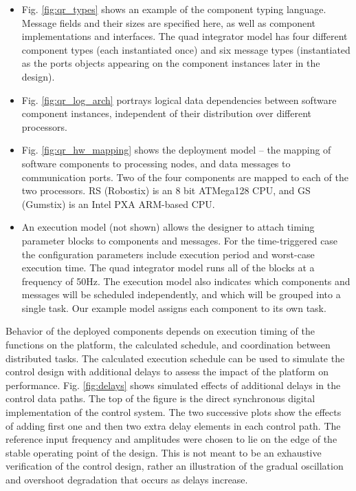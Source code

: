 \begin{itemize}
 \item Fig. \ref{fig:qr_types} shows an example of the component typing
language.  Message fields and their sizes are specified here, as well as
component implementations and interfaces.  The quad integrator model has four
different component types (each instantiated once) and six message types
(instantiated as the ports objects appearing on the component instances later
in the design).
 \item Fig. \ref{fig:qr_log_arch} portrays logical data dependencies between
software component instances, independent of their distribution over different
processors.
 \item Fig. \ref{fig:qr_hw_mapping} shows the deployment model -- the mapping
of software components to processing nodes, and data messages to communication
ports.  Two of the four components are mapped to each of the two processors.  RS
(Robostix) is an 8 bit ATMega128 CPU, and GS (Gumstix) is an Intel PXA ARM-based CPU.
 \item An execution model (not shown) allows the designer to attach timing parameter
blocks to components and messages.  For the time-triggered case the configuration 
parameters include execution period and worst-case execution time.  The quad integrator
model runs all of the blocks at a frequency of 50Hz.  The execution model also indicates 
which components and messages will be scheduled independently, and which will be
grouped into a single task.  Our example model assigns each component to its own task.
\end{itemize}

Behavior of the deployed components depends on execution timing of the functions
on the platform, the calculated schedule, and coordination between distributed
tasks. The calculated execution schedule can be used to simulate the control
design with additional delays to assess the impact of the platform on
performance.  Fig. \ref{fig:delays} shows simulated effects of additional delays
in the control data paths.  The top of the figure is the direct synchronous
digital implementation of the control system.  The two successive plots show the
effects of adding first one and then two extra delay elements in each control
path.  The reference input frequency and amplitudes were chosen to lie on the
edge of the stable operating point of the design.  This is not meant to be an
exhaustive verification of the control design, rather an illustration of the
gradual oscillation and overshoot degradation that occurs as delays increase.  


